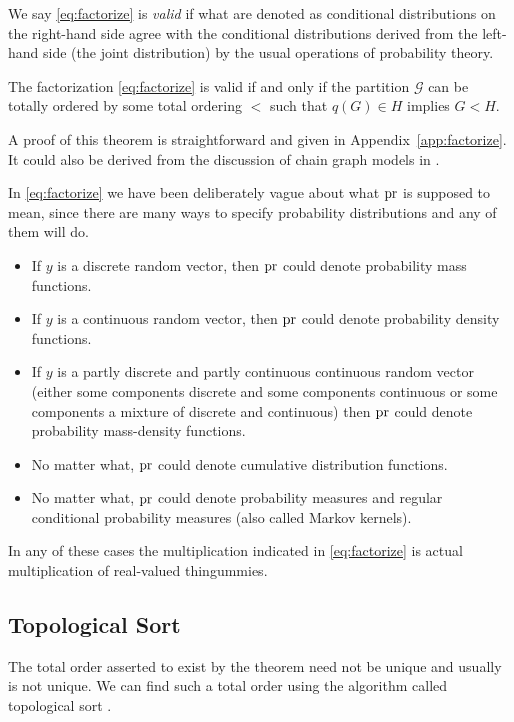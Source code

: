 We say \eqref{eq:factorize} is \emph{valid} if what are denoted as
conditional distributions on the right-hand side agree with the conditional
distributions derived from the left-hand side (the joint distribution) by
the usual operations of probability theory.
\begin{theorem} \label{th:factorize}
The factorization \eqref{eq:factorize} is valid if and only if
the partition $\mathcal{G}$ can be totally ordered
by some total ordering $<$ such that $q(G) \in H$ implies $G < H$.
\end{theorem}
A proof of this theorem is straightforward and given
in Appendix~\ref{app:factorize}.
It could also be derived from the discussion of chain graph models
in \citet[equation~3.23]{lauritzen}.

In \eqref{eq:factorize} we have been deliberately vague about what $\operatorname{pr}$ is
supposed to mean, since there are many ways to specify probability
distributions and any of them will do.
\begin{itemize}
\item If $y$ is a discrete random vector,
      then $\operatorname{pr}$ could denote probability mass functions.
\item If $y$ is a continuous random vector,
      then $\operatorname{pr}$ could denote probability density functions.
\item If $y$ is a partly discrete and partly continuous continuous
      random vector (either some components discrete and some components
      continuous or some components a mixture of discrete and continuous)
      then $\operatorname{pr}$ could denote probability mass-density functions.
\item No matter what, $\operatorname{pr}$ could denote cumulative distribution functions.
\item No matter what, $\operatorname{pr}$ could denote probability measures and
      regular conditional probability measures (also called Markov kernels).
\end{itemize}
In any of these cases the multiplication indicated in \eqref{eq:factorize}
is actual multiplication of real-valued thingummies.

\subsection{Topological Sort}

The total order asserted to exist by the theorem need not be unique and
usually is not unique.
We can find such a total order using the algorithm called topological sort
\citep[Section~6.6]{aho-et-al}.

